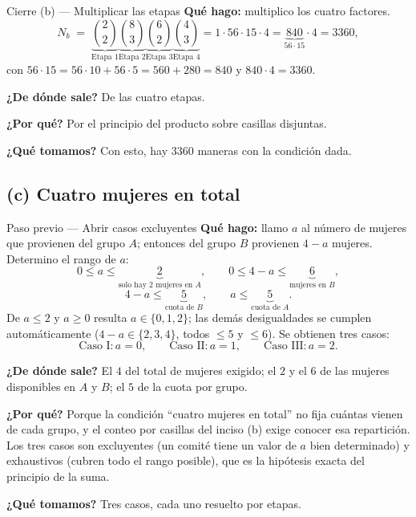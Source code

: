 \documentclass[11pt]{article}
\begin{document}
\begin{paso}{Cierre (b) --- Multiplicar las etapas}
\textbf{Qu\'e hago:} multiplico los cuatro factores.
\[
N_b\;=\;\underbrace{\binom{2}{2}}_{\text{Etapa 1}}\underbrace{\binom{8}{3}}_{\text{Etapa 2}}\underbrace{\binom{6}{2}}_{\text{Etapa 3}}\underbrace{\binom{4}{3}}_{\text{Etapa 4}}
=1\cdot 56\cdot 15\cdot 4=\underbrace{840}_{56\cdot 15}\cdot 4=3360 ,
\]
con $56\cdot 15=56\cdot 10+56\cdot 5=560+280=840$ y $840\cdot 4=3360$.

\textbf{¿De d\'onde sale?} De las cuatro etapas.

\textbf{¿Por qu\'e?} Por el principio del producto sobre casillas disjuntas.

\textbf{¿Qu\'e tomamos?} Con esto, hay $3360$ maneras con la condici\'on dada.
\end{paso}

\subsection*{(c) Cuatro mujeres en total}

\begin{paso}{Paso previo --- Abrir casos excluyentes}
\textbf{Qu\'e hago:} llamo $a$ al n\'umero de mujeres que provienen del grupo $A$; entonces del grupo $B$
provienen $4-a$ mujeres. Determino el rango de $a$:
\[
0\le a\le \underbrace{2}_{\text{solo hay 2 mujeres en }A},\qquad
0\le 4-a\le \underbrace{6}_{\text{mujeres en }B},
\]
\[
4-a\le \underbrace{5}_{\text{cuota de }B},\qquad a\le \underbrace{5}_{\text{cuota de }A}.
\]
De $a\le 2$ y $a\ge 0$ resulta $a\in\{0,1,2\}$; las dem\'as desigualdades se cumplen autom\'aticamente
($4-a\in\{2,3,4\}$, todos $\le 5$ y $\le 6$). Se obtienen tres casos:
\[
\text{Caso I}: a=0,\qquad \text{Caso II}: a=1,\qquad \text{Caso III}: a=2 .
\]

\textbf{¿De d\'onde sale?} El $4$ del total de mujeres exigido; el $2$ y el $6$ de las mujeres disponibles en
$A$ y $B$; el $5$ de la cuota por grupo.

\textbf{¿Por qu\'e?} Porque la condici\'on ``cuatro mujeres en total'' no fija cu\'antas vienen de cada
grupo, y el conteo por casillas del inciso (b) exige conocer esa repartici\'on. Los tres casos son
excluyentes (un comit\'e tiene un valor de $a$ bien determinado) y exhaustivos (cubren todo el rango
posible), que es la hip\'otesis exacta del principio de la suma.

\textbf{¿Qu\'e tomamos?} Tres casos, cada uno resuelto por etapas.
\end{paso}
\end{document}
